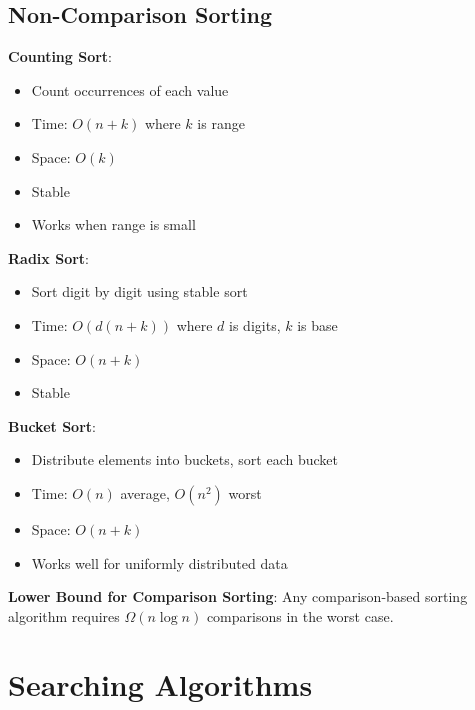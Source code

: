 \documentclass[12pt,a4paper]{report}
\begin{document}
\subsection{Non-Comparison Sorting}
\begin{concept}
\textbf{Counting Sort}:
\begin{itemize}
    \item Count occurrences of each value
    \item Time: $O(n + k)$ where $k$ is range
    \item Space: $O(k)$
    \item Stable
    \item Works when range is small
\end{itemize}

\textbf{Radix Sort}:
\begin{itemize}
    \item Sort digit by digit using stable sort
    \item Time: $O(d(n + k))$ where $d$ is digits, $k$ is base
    \item Space: $O(n + k)$
    \item Stable
\end{itemize}

\textbf{Bucket Sort}:
\begin{itemize}
    \item Distribute elements into buckets, sort each bucket
    \item Time: $O(n)$ average, $O(n^2)$ worst
    \item Space: $O(n + k)$
    \item Works well for uniformly distributed data
\end{itemize}
\end{concept}

\begin{theorem}
\textbf{Lower Bound for Comparison Sorting}: Any comparison-based sorting algorithm requires $\Omega(n \log n)$ comparisons in the worst case.
\end{theorem}

\section{Searching Algorithms}
\end{document}
